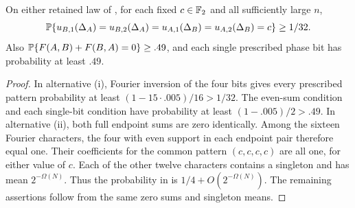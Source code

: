 \begin{corollary}
\label{tp:phase-compatibility}
On either retained law of , for each
fixed \(c\in\mathbb F_2\) and all sufficiently large \(n\),
\begin{equation}
 \mathbb P\{u_{B,1}(\Delta_A)=u_{B,2}(\Delta_A)
       =u_{A,1}(\Delta_B)=u_{A,2}(\Delta_B)=c\}\ge1/32.
 \label{eq:tp-four-equal-phases}
\end{equation}
Also \(\mathbb P\{F(A,B)+F(B,A)=0\}\ge .49\), and each single
prescribed phase bit has probability at least \(.49\).
\end{corollary}
\begin{proof}
In alternative \textup{(i)}, Fourier inversion of the four bits
gives every prescribed pattern probability at least
\((1-15\cdot .005)/16>1/32\).  The even-sum condition and each
single-bit condition have probability at least
\((1-.005)/2>.49\).
In alternative \textup{(ii)}, both full endpoint sums are zero
identically.  Among the sixteen Fourier characters, the four
with even support in each endpoint pair therefore equal one.
Their coefficients for the common pattern \((c,c,c,c)\) are all
one, for either value of \(c\).  Each of the other twelve
characters contains a singleton and has mean \(2^{-\Omega(N)}\).
Thus the probability in  is
\(1/4+O(2^{-\Omega(N)})\).  The remaining assertions follow
from the same zero sums and singleton means.
\end{proof}

